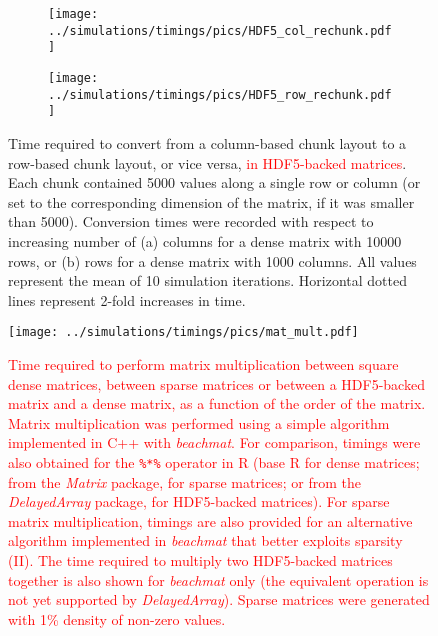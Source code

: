 \documentclass{article}
\newcommand{\beachmat}{\textit{beachmat}}
\newcommand{\code}[1]{\texttt{#1}}
\newcommand{\revised}[1]{\textcolor{red}{#1}}
\begin{document}
\begin{figure}[bt]
    \begin{subfigure}[bt]{0.49\textwidth}
        \texttt{[image: ../simulations/timings/pics/HDF5\_col\_rechunk.pdf]}
        \caption{}
    \end{subfigure}
    \begin{subfigure}[bt]{0.49\textwidth}
        \texttt{[image: ../simulations/timings/pics/HDF5\_row\_rechunk.pdf]}
        \caption{}
    \end{subfigure}
    \caption{Time required to convert from a column-based chunk layout to a row-based chunk layout, or vice versa, \revised{in HDF5-backed matrices}.
        Each chunk contained 5000 values along a single row or column (or set to the corresponding dimension of the matrix, if it was smaller than 5000).
        Conversion times were recorded with respect to increasing number of (a) columns for a dense matrix with 10000 rows, or (b) rows for a dense matrix with 1000 columns.
        All values represent the mean of 10 simulation iterations.
        Horizontal dotted lines represent 2-fold increases in time.
    }
    \label{fig:hdf5rechunk}
\end{figure}

\begin{figure}[bt]
    \begin{center}
        \texttt{[image: ../simulations/timings/pics/mat\_mult.pdf]}
    \end{center}
    \caption{\revised{Time required to perform matrix multiplication between square dense matrices, between sparse matrices or between a HDF5-backed matrix and a dense matrix,
as a function of the order of the matrix.     
Matrix multiplication was performed using a simple algorithm implemented in C++ with \beachmat{}.
For comparison, timings were also obtained for the \code{\%*\%} operator in R (base R for dense matrices; 
    from the \textit{Matrix} package, for sparse matrices;
    or from the \textit{DelayedArray} package, for HDF5-backed matrices).
For sparse matrix multiplication, timings are also provided for an alternative algorithm implemented in \beachmat{} that better exploits sparsity (II). 
The time required to multiply two HDF5-backed matrices together is also shown for \beachmat{} only (the equivalent operation is not yet supported by \textit{DelayedArray}).
Sparse matrices were generated with 1\% density of non-zero values.}}
    \label{fig:matmult}
\end{figure}

\end{document}
